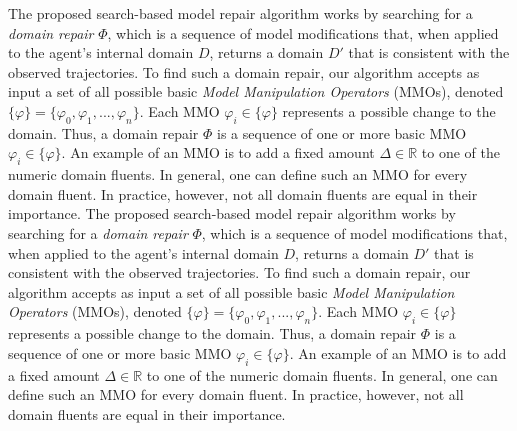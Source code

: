 \documentclass[letterpaper]{article} %
\begin{document}
The proposed search-based model repair algorithm works by searching for a \emph{domain repair} $\varPhi$, which is a sequence of model modifications that, when applied to the agent's internal domain $D$, returns a domain $D'$ that is consistent with the observed trajectories.
To find such a domain repair, our algorithm accepts as input a set of all possible basic \emph{Model Manipulation Operators} (MMOs), denoted $\{\varphi\} = \{\varphi_0, \varphi_1, ... , \varphi_n\}$. Each MMO $\varphi_i \in \{\varphi\}$ represents a possible change to the domain. Thus, a domain repair $\varPhi$ is a sequence of one or more basic MMO $\varphi_i \in \{\varphi\}$. An example of an MMO is to add a fixed amount $\Delta\in\mathbb{R}$ to one of the numeric domain fluents.
In general, one can define such an MMO for every domain fluent. In practice, however, not all domain fluents are equal in their importance.
The proposed search-based model repair algorithm works by searching for a \emph{domain repair} $\varPhi$, which is a sequence of model modifications that, when applied to the agent's internal domain $D$, returns a domain $D'$ that is consistent with the observed trajectories.
To find such a domain repair, our algorithm accepts as input a set of all possible basic \emph{Model Manipulation Operators} (MMOs), denoted $\{\varphi\} = \{\varphi_0, \varphi_1, ... , \varphi_n\}$. Each MMO $\varphi_i \in \{\varphi\}$ represents a possible change to the domain. Thus, a domain repair $\varPhi$ is a sequence of one or more basic MMO $\varphi_i \in \{\varphi\}$. An example of an MMO is to add a fixed amount $\Delta\in\mathbb{R}$ to one of the numeric domain fluents.
In general, one can define such an MMO for every domain fluent. In practice, however, not all domain fluents are equal in their importance.
\end{document}
